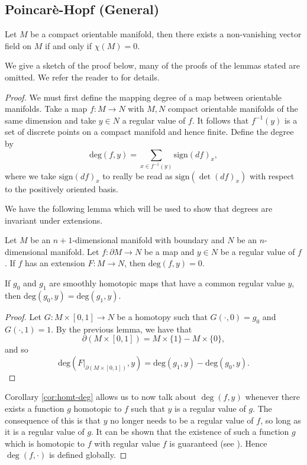 \subsection{Poincar\`{e}-Hopf (General) \label{sec:ph-gen-sec}}
\begin{theorem}
Let $M$ be a compact orientable manifold, then there exists a non-vanishing vector field on $M$ if and only if $\chi(M)=0$.
\end{theorem}
We give a sketch of the proof below, many of the proofs of the lemmas stated are omitted. We refer the reader to \cite{wrightPoincare} for details.
\begin{proof}
We must first define the mapping degree of a map between orientable manifolds. Take a map $f:M\to N$ with $M,N$ compact orientable manifolds of the same dimension and take $y\in N$ a regular value of $f$. It follows that $f^{-1}(y)$ is a set of discrete points on a compact manifold and hence finite. Define the degree by
\[
\mathrm{deg}(f,y)=\sum_{x\in f^{-1}(y)}\mathrm{sign}(df)_x,
\]
where we take $\mathrm{sign}(df)_x$ to really be read as $\mathrm{sign}(\det(df)_x)$ with respect to the positively oriented basis.

We have the following lemma which will be used to show that degrees are invariant under extensions.
\begin{lemma}
Let $M$ be an $n+1$-dimensional manifold with boundary and $N$ be an $n$-dimensional manifold. Let $f:\partial M\to N$ be a map and $y\in N$ be a regular value of $f$. If $f$ has an extension $F:M\to N$, then $\mathrm{deg}(f,y)=0$.
\end{lemma}
\begin{corollary}
If $g_0$ and $g_1$ are smoothly homotopic maps that have a common regular value $y$, then $\mathrm{deg}(g_0,y)=\mathrm{deg}(g_1,y)$.
\label{cor:homt-deg}
\end{corollary}
\begin{proof}
Let $G:M\times [0,1]\to N$ be a homotopy such that $G(\cdot,0)=g_0$ and $G(\cdot,1)=1$. By the previous lemma, we have that
\[
\partial(M\times [0,1])=M\times\{1\}- M\times\{0\},
\]
and so
\[
\mathrm{deg}(F\rvert_{\partial(M\times [0,1])},y)=\mathrm{deg}(g_1,y)-\mathrm{deg}(g_0,y).
\]
\end{proof}
Corollary \ref{cor:homt-deg} allows us to now talk about $\deg(f,y)$ whenever there exists a function $g$ homotopic to $f$ such that $y$ is a regular value of $g$. The consequence of this is that $y$ no longer needs to be a regular value of $f$, so long as it is a regular value of $g$. It can be shown that the existence of such a function $g$ which is homotopic to $f$ with regular value $f$ is guaranteed (see \cite{BurnsGidea,wrightPoincare}). Hence $\deg(f,\cdot)$ is defined globally.


\end{proof}
